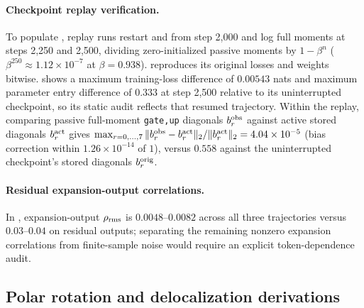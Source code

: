 \paragraph{Checkpoint replay verification.}
To populate , replay runs restart  and  from step 2,000 and log full moments at steps 2,250 and 2,500, dividing zero-initialized passive moments by $1-\beta^n$ ($\beta^{250}\approx1.12\times10^{-7}$ at $\beta=0.938$).  reproduces its original losses and weights bitwise.  shows a maximum training-loss difference of $0.00543$ nats and maximum parameter entry difference of $0.333$ at step 2,500 relative to its uninterrupted checkpoint, so its static audit reflects that resumed trajectory. Within the replay, comparing passive full-moment \texttt{gate,up} diagonals $b_r^{\rm obs}$ against active stored diagonals $b_r^{\rm act}$ gives $\max_{r=0,\ldots,7}\|b_r^{\rm obs}-b_r^{\rm act}\|_2/\|b_r^{\rm act}\|_2=4.04\times10^{-5}$ (bias correction within $1.26\times10^{-14}$ of $1$), versus $0.558$ against the uninterrupted checkpoint's stored diagonals $b_r^{\rm orig}$.



\paragraph{Residual expansion-output correlations.}
In , expansion-output $\rho_{\rm rms}$ is $0.0048\text{--}0.0082$ across all three trajectories versus $0.03\text{--}0.04$ on residual outputs; separating the remaining nonzero expansion correlations from finite-sample noise would require an explicit token-dependence audit.

\subsection{Polar rotation and delocalization derivations}

